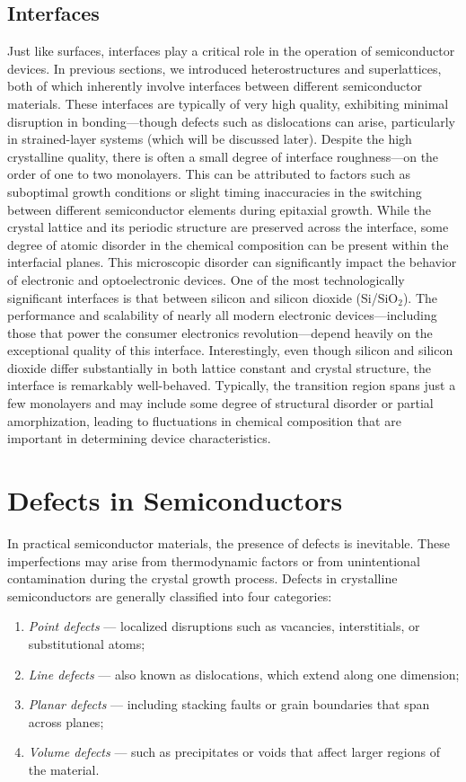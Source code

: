 \subsection{Interfaces}
Just like surfaces, interfaces play a critical role in the operation of semiconductor devices. In previous sections, we introduced heterostructures and superlattices, both of which inherently involve interfaces between different semiconductor materials. These interfaces are typically of very high quality, exhibiting minimal disruption in bonding—though defects such as dislocations can arise, particularly in strained-layer systems (which will be discussed later).
Despite the high crystalline quality, there is often a small degree of interface roughness—on the order of one to two monolayers. This can be attributed to factors such as suboptimal growth conditions or slight timing inaccuracies in the switching between different semiconductor elements during epitaxial growth. While the crystal lattice and its periodic structure are preserved across the interface, some degree of atomic disorder in the chemical composition can be present within the interfacial planes. This microscopic disorder can significantly impact the behavior of electronic and optoelectronic devices.
One of the most technologically significant interfaces is that between silicon and silicon dioxide (Si/SiO$_2$). The performance and scalability of nearly all modern electronic devices—including those that power the consumer electronics revolution—depend heavily on the exceptional quality of this interface. Interestingly, even though silicon and silicon dioxide differ substantially in both lattice constant and crystal structure, the interface is remarkably well-behaved. Typically, the transition region spans just a few monolayers and may include some degree of structural disorder or partial amorphization, leading to fluctuations in chemical composition that are important in determining device characteristics.

\section{Defects in Semiconductors}
In practical semiconductor materials, the presence of defects is inevitable. These imperfections may arise from thermodynamic factors or from unintentional contamination during the crystal growth process. Defects in crystalline semiconductors are generally classified into four categories:
\begin{enumerate}
	\item \textit{Point defects} — localized disruptions such as vacancies, interstitials, or substitutional atoms;
	\item \textit{Line defects} — also known as dislocations, which extend along one dimension;
	\item \textit{Planar defects} — including stacking faults or grain boundaries that span across planes;
	\item \textit{Volume defects} — such as precipitates or voids that affect larger regions of the material.
\end{enumerate}

